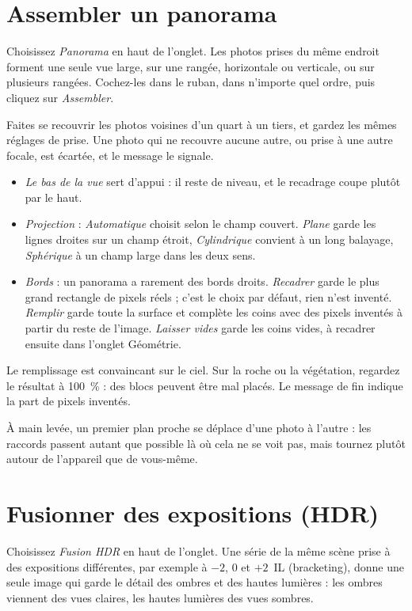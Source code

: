 \section{Assembler un panorama}
Choisissez \emph{Panorama} en haut de l’onglet. Les photos prises du même endroit forment
une seule vue large, sur une rangée, horizontale ou verticale, ou sur plusieurs rangées.
Cochez-les dans le ruban, dans n’importe quel ordre, puis cliquez sur \emph{Assembler}.

Faites se recouvrir les photos voisines d’un quart à un tiers, et gardez les mêmes réglages
de prise. Une photo qui ne recouvre aucune autre, ou prise à une autre focale, est écartée, et
le message le signale.

\begin{itemize}
\item \emph{Le bas de la vue} sert d’appui : il reste de niveau, et le recadrage coupe plutôt
par le haut.
\item \emph{Projection} : \emph{Automatique} choisit selon le champ couvert. \emph{Plane}
garde les lignes droites sur un champ étroit, \emph{Cylindrique} convient à un long balayage,
\emph{Sphérique} à un champ large dans les deux sens.
\item \emph{Bords} : un panorama a rarement des bords droits. \emph{Recadrer} garde le plus
grand rectangle de pixels réels ; c’est le choix par défaut, rien n’est inventé. \emph{Remplir}
garde toute la surface et complète les coins avec des pixels inventés à partir du reste de
l’image. \emph{Laisser vides} garde les coins vides, à recadrer ensuite dans l’onglet Géométrie.
\end{itemize}
Le remplissage est convaincant sur le ciel. Sur la roche ou la végétation, regardez le résultat
à 100~\% : des blocs peuvent être mal placés. Le message de fin indique la part de pixels
inventés.

À main levée, un premier plan proche se déplace d’une photo à l’autre : les raccords passent
autant que possible là où cela ne se voit pas, mais tournez plutôt autour de l’appareil que
de vous-même.

\section{Fusionner des expositions (HDR)}
Choisissez \emph{Fusion HDR} en haut de l’onglet. Une série de la même scène prise à des
expositions différentes, par exemple à $-2$, $0$ et $+2$~IL (bracketing), donne une seule
image qui garde le détail des ombres et des hautes lumières : les ombres viennent des vues
claires, les hautes lumières des vues sombres.

